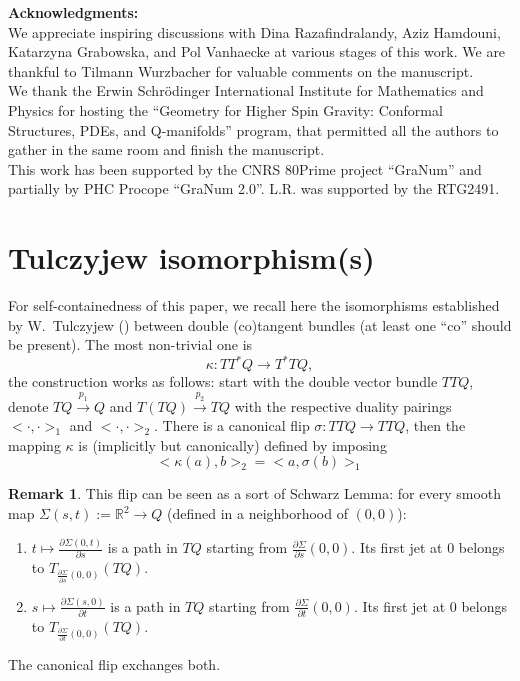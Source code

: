 \documentclass[a4paper,12pt]{amsart}
\theoremstyle{definition}
\newtheorem{Remark}[Definition]{Remark}
\begin{document}
\textbf{Acknowledgments:} \\
We appreciate inspiring discussions with Dina Razafindralandy, Aziz Hamdouni,  Katarzyna Grabowska, and Pol Vanhaecke at various stages of this work. We are thankful to Tilmann Wurzbacher for valuable comments on the manuscript. \\
We thank the Erwin Schr\"odinger International Institute for Mathematics and Physics for hosting the ``Geometry for Higher Spin Gravity: Conformal Structures, PDEs, and Q-manifolds'' program, that permitted all the authors to gather in the same room and finish the manuscript. \\ 
This work has been supported by the CNRS 80Prime project ``GraNum'' and partially by PHC Procope ``GraNum 2.0''. {L.R. was supported by the RTG2491.}

\appendix

\section{Tulczyjew isomorphism(s)}
\label{tul-iso}
For self-containedness of this paper, we recall here the isomorphisms established by W.~Tulczyjew (\cite{tulcz, tulcz2}) between double (co)tangent bundles (at least one ``co'' should be present). The most non-trivial one is 
$$
\kappa \colon TT^*Q \to T^*TQ,
$$ the construction works as follows: start with the double vector bundle $TTQ$, \\
denote $TQ \overset{p_1}{\to} Q$ and $T(TQ) \overset{p_2}{\to} TQ$ with the respective duality pairings $<\cdot,\cdot>_1$  and $<\cdot,\cdot>_2$. There is a canonical flip $\sigma \colon TTQ \to TTQ$, then the mapping $\kappa$ is (implicitly but canonically) defined by imposing 
$$
  <\kappa(a), b>_2 = <a, \sigma(b)>_1
$$
\begin{Remark}
This flip can be seen as a sort of Schwarz Lemma: for every smooth map $\Sigma(s,t):= \mathbb R^2 \to Q $ (defined in a neighborhood of $(0,0)$):
\begin{enumerate}
    \item $t \mapsto \frac{\partial \Sigma(0,t)}{\partial s} $ is a path in $ TQ$ starting from $\frac{\partial \Sigma}{\partial s}(0,0) $. Its first jet at $0$ belongs to $T_{ \frac{\partial \Sigma}{\partial s}(0,0)}  (TQ) $.
    \item $s \mapsto \frac{\partial \Sigma(s,0)}{\partial t} $ is a path in $ TQ$ starting from $\frac{\partial \Sigma}{\partial t}(0,0) $. Its first jet at $0$ belongs to $T_{ \frac{\partial \Sigma}{\partial t}(0,0)}  (TQ) $.
\end{enumerate}
The canonical flip exchanges both. 
\end{Remark}
\end{document}
